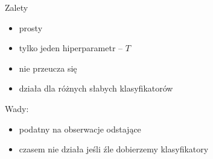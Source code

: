Zalety
\begin{itemize}
    \item prosty
    \item tylko jeden hiperparametr -- \( T \)
    \item nie przeucza się
    \item działa dla różnych słabych klasyfikatorów
\end{itemize}

Wady:
\begin{itemize}
    \item podatny na obserwacje odstające
    \item czasem nie działa jeśli źle dobierzemy klasyfikatory
\end{itemize}